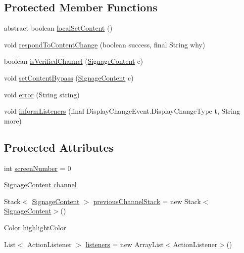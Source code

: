 \subsection*{Protected Member Functions}
\begin{DoxyCompactItemize}
\item 
abstract boolean \hyperlink{classgov_1_1fnal_1_1ppd_1_1dd_1_1display_1_1DisplayImpl_ad7d3f64a1788e1ba7887fc47028fb9c3}{local\-Set\-Content} ()
\item 
void \hyperlink{classgov_1_1fnal_1_1ppd_1_1dd_1_1display_1_1DisplayImpl_a196c203a790e4dfbf873cce363519e57}{respond\-To\-Content\-Change} (boolean success, final String why)
\item 
boolean \hyperlink{classgov_1_1fnal_1_1ppd_1_1dd_1_1display_1_1DisplayImpl_a1cd34d3710136494c4cfad17c29bc001}{is\-Verified\-Channel} (\hyperlink{interfacegov_1_1fnal_1_1ppd_1_1dd_1_1signage_1_1SignageContent}{Signage\-Content} c)
\item 
void \hyperlink{classgov_1_1fnal_1_1ppd_1_1dd_1_1display_1_1DisplayImpl_a4f5d156cebdc544eaa992153e5ccd137}{set\-Content\-Bypass} (\hyperlink{interfacegov_1_1fnal_1_1ppd_1_1dd_1_1signage_1_1SignageContent}{Signage\-Content} c)
\item 
void \hyperlink{classgov_1_1fnal_1_1ppd_1_1dd_1_1display_1_1DisplayImpl_ab240ed8a72e4006fb21eb6f30765f3df}{error} (String string)
\item 
void \hyperlink{classgov_1_1fnal_1_1ppd_1_1dd_1_1display_1_1DisplayImpl_a55d3593b3c95df466ddb7f5d59b2bfa2}{inform\-Listeners} (final Display\-Change\-Event.\-Display\-Change\-Type t, String more)
\end{DoxyCompactItemize}
\subsection*{Protected Attributes}
\begin{DoxyCompactItemize}
\item 
int \hyperlink{classgov_1_1fnal_1_1ppd_1_1dd_1_1display_1_1DisplayImpl_ace620614bde13cee492129c27f38db4e}{screen\-Number} = 0
\item 
\hyperlink{interfacegov_1_1fnal_1_1ppd_1_1dd_1_1signage_1_1SignageContent}{Signage\-Content} \hyperlink{classgov_1_1fnal_1_1ppd_1_1dd_1_1display_1_1DisplayImpl_a190a737d7c69248d533e0dc016dcd755}{channel}
\item 
Stack$<$ \hyperlink{interfacegov_1_1fnal_1_1ppd_1_1dd_1_1signage_1_1SignageContent}{Signage\-Content} $>$ \hyperlink{classgov_1_1fnal_1_1ppd_1_1dd_1_1display_1_1DisplayImpl_a1732d577755dfc58b9762a41599fa4ed}{previous\-Channel\-Stack} = new Stack$<$\hyperlink{interfacegov_1_1fnal_1_1ppd_1_1dd_1_1signage_1_1SignageContent}{Signage\-Content}$>$()
\item 
Color \hyperlink{classgov_1_1fnal_1_1ppd_1_1dd_1_1display_1_1DisplayImpl_af12ff2aa5231a9bb08e12b1dbd0dea7c}{highlight\-Color}
\item 
List$<$ Action\-Listener $>$ \hyperlink{classgov_1_1fnal_1_1ppd_1_1dd_1_1display_1_1DisplayImpl_aa4a7dad0a486d2f888cf47921423e2c1}{listeners} = new Array\-List$<$Action\-Listener$>$()
\end{DoxyCompactItemize}
